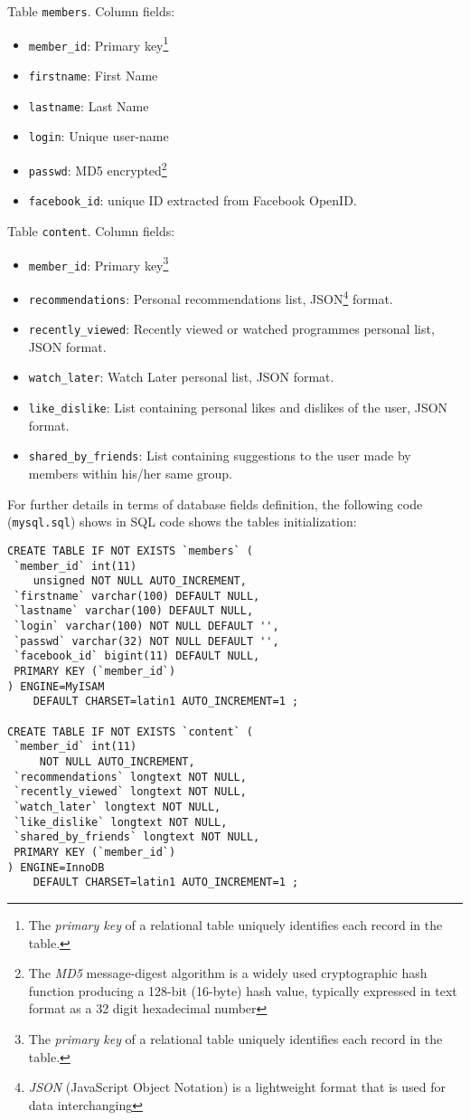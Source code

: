 \documentclass{acm_proc_article-sp}
\begin{document}
Table \texttt{members}. Column fields:

\begin{itemize}
\item \texttt{member\_id}: Primary key\footnote{The \textit{primary key} of a relational table uniquely identifies each record in the table.}
\item \texttt{firstname}: First Name
\item \texttt{lastname}: Last Name
\item \texttt{login}: Unique user-name
\item \texttt{passwd}: MD5 encrypted\footnote{The \textit{MD5} message-digest algorithm is a widely used cryptographic hash function producing a 128-bit (16-byte) hash value, typically expressed in text format as a 32 digit hexadecimal number}
\item \texttt{facebook\_id}: unique ID extracted from Facebook OpenID.
\end{itemize}

Table \texttt{content}. Column fields:

\begin{itemize}
\item \texttt{member\_id}: Primary key\footnote{The \textit{primary key} of a relational table uniquely identifies each record in the table.}
\item \texttt{recommendations}: Personal recommendations list, JSON\footnote{\textit{JSON} (JavaScript Object Notation) is a lightweight format that is used for data interchanging} format.
\item \texttt{recently\_viewed}: Recently viewed or watched programmes personal list, JSON format.
\item \texttt{watch\_later}: Watch Later personal list, JSON format.
\item \texttt{like\_dislike}: List containing personal likes and dislikes of the user, JSON format.
\item \texttt{shared\_by\_friends}: List containing suggestions to the user made by members within his/her same group. 
\end{itemize}

For further details in terms of database fields definition, the following code (\texttt{mysql.sql}) shows in SQL code shows the tables initialization: 

\begin{lstlisting}
CREATE TABLE IF NOT EXISTS `members` (
 `member_id` int(11) 
    unsigned NOT NULL AUTO_INCREMENT,
 `firstname` varchar(100) DEFAULT NULL,
 `lastname` varchar(100) DEFAULT NULL,
 `login` varchar(100) NOT NULL DEFAULT '',
 `passwd` varchar(32) NOT NULL DEFAULT '',
 `facebook_id` bigint(11) DEFAULT NULL,
 PRIMARY KEY (`member_id`)
) ENGINE=MyISAM  
    DEFAULT CHARSET=latin1 AUTO_INCREMENT=1 ;

CREATE TABLE IF NOT EXISTS `content` (
 `member_id` int(11) 
     NOT NULL AUTO_INCREMENT,
 `recommendations` longtext NOT NULL,
 `recently_viewed` longtext NOT NULL,
 `watch_later` longtext NOT NULL,
 `like_dislike` longtext NOT NULL,
 `shared_by_friends` longtext NOT NULL,
 PRIMARY KEY (`member_id`)
) ENGINE=InnoDB  
    DEFAULT CHARSET=latin1 AUTO_INCREMENT=1 ;
\end{lstlisting}
\end{document}
